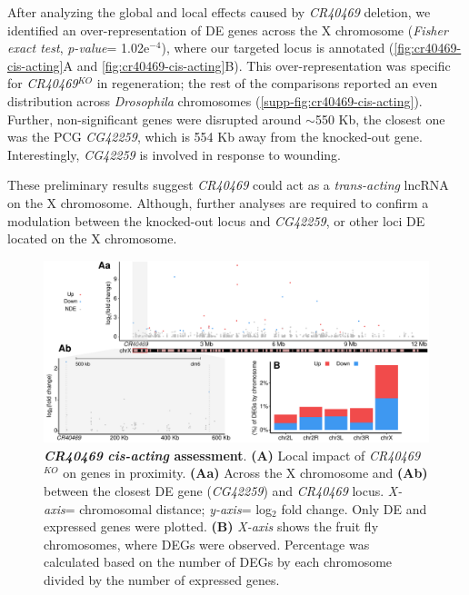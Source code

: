 After analyzing the global and local effects caused by \textit{CR40469} deletion, we identified an over-representation of DE genes across the X chromosome (\textit{Fisher exact test}, \textit{p-value}= 1.02e$^{-4}$), where our targeted locus is annotated (\autoref{fig:cr40469-cis-acting}A and \autoref{fig:cr40469-cis-acting}B). This over-representation was specific for \textit{CR40469}$^{KO}$ in regeneration; the rest of the comparisons reported an even distribution across \textit{Drosophila} chromosomes (\autoref{supp-fig:cr40469-cis-acting}). Further, non-significant genes were disrupted around $\sim$550 Kb, the closest one was the PCG \textit{CG42259}, which is 554 Kb away from the knocked-out gene. Interestingly, \textit{CG42259} is involved in response to wounding.\autocite{tattikota_2020_CG42259}

These preliminary results suggest \textit{CR40469} could act as a \textit{trans-acting} lncRNA on the X chromosome. Although, further analyses are required to confirm a modulation between the knocked-out locus and \textit{CG42259}, or other loci DE located on the X chromosome. 

\begin{figure}[ht!]
  \centering
  \includegraphics[scale=0.6]{plots/results/dme/cis.acting.pdf}
    \caption[\textit{CR40469} \textit{cis-acting} assessment]{\textbf{\textit{CR40469} \textit{cis-acting} assessment}. \textbf{(A)} Local impact of \textit{CR40469}$^{KO}$ on genes in proximity. \textbf{(Aa)} Across the X chromosome and \textbf{(Ab)} between the closest DE gene (\textit{CG42259}) and \textit{CR40469} locus. \textit{X-axis}= chromosomal distance; \textit{y-axis}= log$_2$ fold change. Only DE and expressed genes were plotted. \textbf{(B)} \textit{X-axis} shows the fruit fly chromosomes, where DEGs were observed. Percentage was calculated based on the number of DEGs by each chromosome divided by the number of expressed genes.}
  \label{fig:cr40469-cis-acting}
\end{figure}

